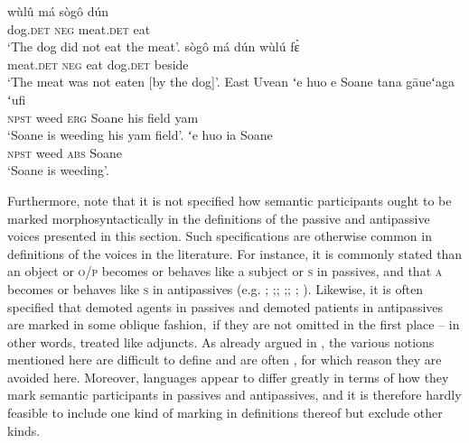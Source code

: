 \ea {} \citep[112]{creissels:2016}
	\ea\label{ex:Bambara:eat:a}
	\gll	wùlû 				má 				sògô 				dún 	\\
			dog.\textsc{det} 	\textsc{neg} 	meat.\textsc{det} 	eat 	\\
	\glt	‘The dog did not eat the meat’.
	\ex\label{ex:Bambara:eat:b}
	\gll	sògô				má				dún		{\ob}wùlú				fɛ̀{\cb} \\
			meat.\textsc{det}	\textsc{neg}	eat		{\db}dog.\textsc{det}	beside	\\
	\glt	‘The meat was not eaten [by the dog]’.
	\z
\z
\ea East Uvean \citep[110]{creissels:2016}
	\ea\label{ex:EastUvean:weed:a}
	\gll	ʻe				huo		e				Soane	tana	gāueʻaga	ʻufi	\\
			\textsc{npst} 	weed 	\textsc{erg} 	Soane 	his 	field 		yam		\\
	\glt	‘Soane is weeding his yam field’.
	\ex\label{ex:EastUvean:weed:b}
	\gll	ʻe				huo		ia				Soane	\\
			\textsc{npst}	weed	\textsc{abs}	Soane	\\
	\glt	‘Soane is weeding’.
	\z
\z

Furthermore, note that it is not specified how semantic participants ought to be marked morphosyntactically in the definitions of the passive and antipassive voices presented in this section. Such specifications are otherwise common in definitions of the voices in the literature. For instance, it is commonly stated than an object or \textsc{o/p} becomes or behaves like a subject or \textsc{s} in passives, and that \textsc{a} becomes or behaves like \textsc{s} in antipassives (e.g. \citealt[32]{dixon:2000}; \citealt[7ff.]{dixon:aikhenvald:2000};; \citealt[200f.]{peterson:2007};; \citealt[371, 380]{kulikov:2010}; \citealt[412]{malchukov:2016}). Likewise, it is often specified that demoted agents in passives and demoted patients in antipassives are marked in some oblique fashion,\ if they are not omitted in the first place -- in other words, treated like adjuncts. As already argued in , the various notions mentioned here are difficult to define and are often , for which reason they are avoided here. Moreover, languages appear to differ greatly in terms of how they mark semantic participants in passives and antipassives, and it is therefore hardly feasible to include one kind of marking in definitions thereof but exclude other kinds.

